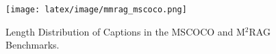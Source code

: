 \begin{figure}[t]
    \centering
    \texttt{[image: latex/image/mmrag\_mscoco.png]}
    \caption{Length Distribution of Captions in the MSCOCO and M$^2$RAG Benchmarks.}
    \label{fig:img_cap_compare}
\end{figure}